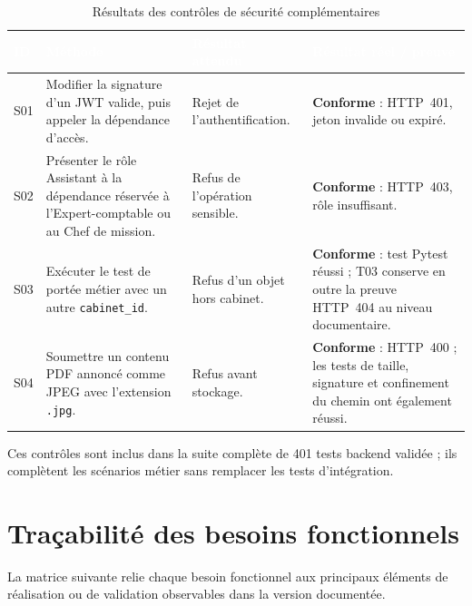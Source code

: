 \documentclass[12pt,a4paper,oneside]{report}
\newcommand{\TableSetup}{%
  \arrayrulecolor{ComptaTableLine}%
  \setlength{\arrayrulewidth}{0.45pt}%
  \renewcommand{\arraystretch}{1.18}%
}
\newcommand{\TableHead}[1]{\textcolor{white}{\textbf{#1}}}
\newcommand{\TableSuccess}[1]{\textcolor{ComptaGreen}{\textbf{#1}}}
\begin{document}
\begin{table}[H]
\centering
\caption{Résultats des contrôles de sécurité complémentaires}
\footnotesize
\TableSetup
\begin{tabularx}{\textwidth}{|L{1.2cm}|L{4.3cm}|L{3.8cm}|Y|}
\toprule
{}\TableHead{ID} & \TableHead{Méthode} & \TableHead{Résultat attendu} & \TableHead{Résultat réel / preuve} \\
\midrule
S01 & Modifier la signature d'un JWT valide, puis appeler la dépendance d'accès. & Rejet de l'authentification. & \TableSuccess{Conforme} : HTTP~401, jeton invalide ou expiré. \\
S02 & Présenter le rôle Assistant à la dépendance réservée à l'Expert-comptable ou au Chef de mission. & Refus de l'opération sensible. & \TableSuccess{Conforme} : HTTP~403, rôle insuffisant. \\
S03 & Exécuter le test de portée métier avec un autre \texttt{cabinet\_id}. & Refus d'un objet hors cabinet. & \TableSuccess{Conforme} : test Pytest réussi ; T03 conserve en outre la preuve HTTP~404 au niveau documentaire. \\
S04 & Soumettre un contenu PDF annoncé comme JPEG avec l'extension \texttt{.jpg}. & Refus avant stockage. & \TableSuccess{Conforme} : HTTP~400 ; les tests de taille, signature et confinement du chemin ont également réussi. \\
\bottomrule
\end{tabularx}
\end{table}

Ces contrôles sont inclus dans la suite complète de 401 tests backend validée ;
ils complètent les scénarios métier sans remplacer les tests d'intégration.

\section{Traçabilité des besoins fonctionnels}

La matrice suivante relie chaque besoin fonctionnel aux principaux éléments de réalisation ou de validation observables dans la version documentée.
\end{document}

